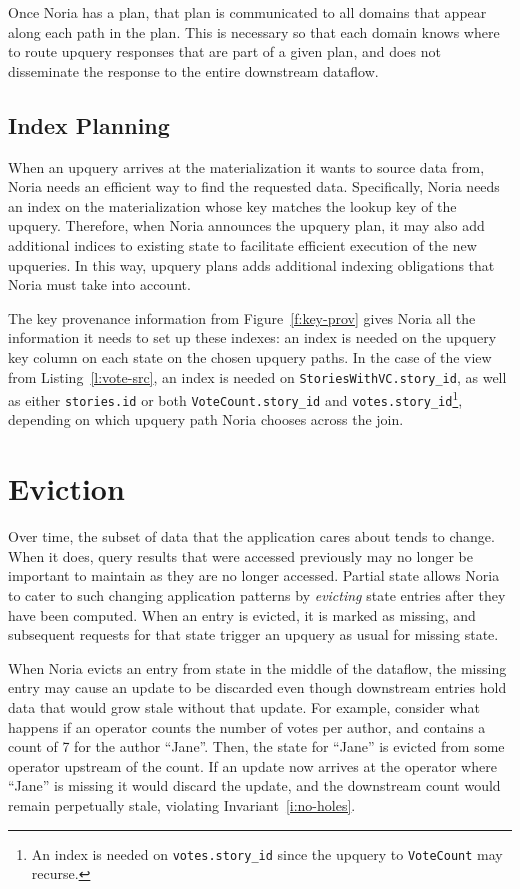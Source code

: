 Once Noria has a plan, that plan is communicated to all domains that appear
along each path in the plan. This is necessary so that each domain knows where
to route upquery responses that are part of a given plan, and does not
disseminate the response to the entire downstream dataflow.

\subsection{Index Planning}

When an upquery arrives at the materialization it wants to source data from,
Noria needs an efficient way to find the requested data. Specifically, Noria
needs an index on the materialization whose key matches the lookup key of the
upquery. Therefore, when Noria announces the upquery plan, it may also add
additional indices to existing state to facilitate efficient execution of the
new upqueries. In this way, upquery plans adds additional indexing obligations
that Noria must take into account.

The key provenance information from Figure~\ref{f:key-prov} gives Noria all the
information it needs to set up these indexes: an index is needed on the upquery
key column on each state on the chosen upquery paths. In the case of the view
from Listing~\ref{l:vote-src}, an index is needed on
\texttt{StoriesWithVC.story\_id}, as well as either \texttt{stories.id} or both
\texttt{VoteCount.story\_id} and \texttt{votes.story\_id}\footnote{An index is
needed on \texttt{votes.story\_id} since the upquery to \texttt{VoteCount} may
recurse.}, depending on which upquery path Noria chooses across the join.

\section{Eviction}
\label{s:eviction}

Over time, the subset of data that the application cares about tends to change.
When it does, query results that were accessed previously may no longer be
important to maintain as they are no longer accessed. Partial state allows Noria
to cater to such changing application patterns by \textit{evicting} state
entries after they have been computed. When an entry is evicted, it is marked as
missing, and subsequent requests for that state trigger an upquery as usual for
missing state.

When Noria evicts an entry from state in the middle of the dataflow, the missing
entry may cause an update to be discarded even though downstream entries hold
data that would grow stale without that update. For example, consider what
happens if an operator counts the number of votes per author, and contains a
count of 7 for the author ``Jane''. Then, the state for ``Jane'' is evicted from
some operator upstream of the count. If an update now arrives at the operator
where ``Jane'' is missing it would discard the update, and the downstream count
would remain perpetually stale, violating Invariant~\ref{i:no-holes}.

